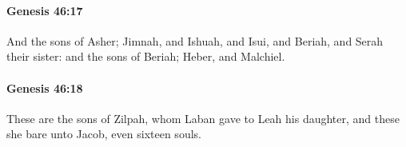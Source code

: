 		\paragraph{Genesis 46:17} %
			\label{GENESIS-46-17}

			And the sons of Asher; Jimnah, and Ishuah, and Isui, and Beriah, and Serah their sister: and the sons of Beriah; Heber, and Malchiel.


		\paragraph{Genesis 46:18} %
			\label{GENESIS-46-18}

			These are the sons of Zilpah, whom Laban gave to Leah his daughter, and these she bare unto Jacob, even sixteen souls.


